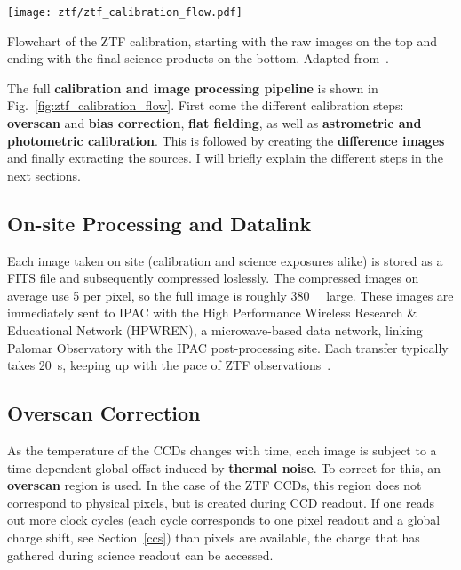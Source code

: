 \begin{marginfigure}
    \texttt{[image: ztf/ztf\_calibration\_flow.pdf]}
    \caption[ZTF realtime flowchart]{Flowchart of the ZTF calibration, starting with the raw images on the top and ending with the final science products on the bottom. Adapted from~\cite{Laher2018}.}
\end{marginfigure}

The full \textbf{calibration and image processing pipeline} is shown in Fig.~\ref{fig:ztf_calibration_flow}. First come the different calibration steps: \textbf{overscan} and \textbf{bias correction}, \textbf{flat fielding}, as well as \textbf{astrometric and photometric calibration}. This is followed by creating the \textbf{difference images} and finally extracting the sources. I will briefly explain the different steps in the next sections.

\subsection{On-site Processing and Datalink}\label{ztf_data_link}

Each image taken on site (calibration and science exposures alike) is stored as a FITS file and subsequently compressed loslessly. The compressed images on average use \SI{5}{\bit} per pixel, so the full image is roughly \SI{380}{\mega\byte} large. These images are immediately sent to IPAC with the High Performance Wireless Research \& Educational Network (HPWREN), a microwave-based data network, linking Palomar Observatory with the IPAC post-processing site. Each transfer typically takes \SI{20}{\second}, keeping up with the pace of ZTF observations~\cite{Dekany2020}.

\subsection{Overscan Correction}
As the temperature of the CCDs changes with time, each image is subject to a time-dependent global offset induced by \textbf{thermal noise}. To correct for this, an \textbf{overscan} region is used. In the case of the ZTF CCDs, this region does not correspond to physical pixels, but is created during CCD readout. If one reads out more clock cycles (each cycle corresponds to one pixel readout and a global charge shift, see Section~\ref{ccs}) than pixels are available, the charge that has gathered during science readout can be accessed.


